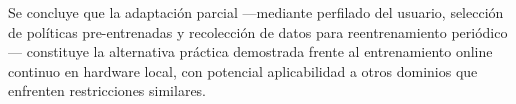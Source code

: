 Se concluye que la adaptación parcial ---mediante perfilado del usuario, selección de políticas pre-entrenadas y recolección de datos para reentrenamiento periódico--- constituye la alternativa práctica demostrada frente al entrenamiento online continuo en hardware local, con potencial aplicabilidad a otros dominios que enfrenten restricciones similares.

\vfill